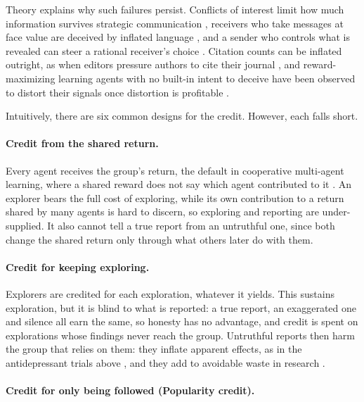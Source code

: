 Theory explains why such failures persist. Conflicts of interest limit how much
information survives strategic communication \citep{crawford1982strategic},
receivers who take messages at face value are deceived by inflated language
\citep{kartik2007credulity}, and a sender who controls what is revealed can
steer a rational receiver's choice \citep{kamenica2011bayesian}. Citation counts
can be inflated outright, as when editors pressure authors to cite their journal
\citep{wilhite2012coercive}, and reward-maximizing learning agents with no
built-in intent to deceive have been observed to distort their signals once
distortion is profitable \citep{alon2023disinformation}.

Intuitively, there are six common designs for the credit. However, each falls
short.

\paragraph{Credit from the shared return.}

Every agent receives the group's return, the default in cooperative multi-agent
learning, where a shared reward does not say which agent contributed to it
\citep{foerster2018coma}. An explorer bears the full cost of exploring, while its
own contribution to a return shared by many agents is hard to discern, so
exploring and reporting are under-supplied. It also cannot tell a true report
from an untruthful one, since both change the shared return only through what
others later do with them.

\paragraph{Credit for keeping exploring.}

Explorers are credited for each exploration, whatever it yields. This sustains exploration, but it is blind to what is reported: a true report, an exaggerated one and silence all earn the same, so honesty has no advantage, and credit is spent on explorations whose findings never reach the group. Untruthful reports then harm the group that relies on them: they inflate apparent effects, as in
the antidepressant trials above \citep {turner2008selective}, and they add to avoidable waste in research \citep{chalmers2009avoidable}.

\paragraph{Credit for only being followed (Popularity credit).}

